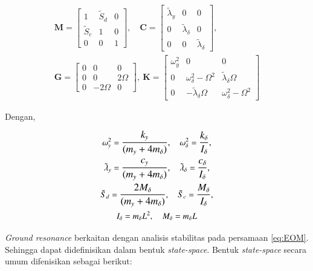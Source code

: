 \begin{equation}
\begin{gathered}
	\mathbf{M}=\begin{bmatrix}
		1& \tilde{S}_d& 0\\
		\tilde{S}_c& 1& 0\\
		0& 0& 1
	\end{bmatrix}, \quad
	\mathbf{C}=\begin{bmatrix}
		\tilde{\lambda}_y& 0& 0\\
		0& \tilde{\lambda}_{\delta}& 0\\
		0& 0& \tilde{\lambda}_{\delta} 
	\end{bmatrix}, \\
	\mathbf{G}=\begin{bmatrix}
		0& 0& 0\\
		0& 0& 2\Omega\\
		0& -2\Omega& 0
	\end{bmatrix}, \
	\mathbf{K}=\begin{bmatrix}
		\omega^2_y& 0& 0\\
		0& \omega^2_{\delta}-\Omega^2& \tilde{\lambda}_{\delta}\Omega\\
		0& -\tilde{\lambda}_{\delta}\Omega& \omega^2_{\delta}-\Omega^2
	\end{bmatrix}
\end{gathered}
\end{equation}

Dengan,

\begin{equation}
	\begin{gathered}
	\omega^2_y = \mathlarger{\frac{k_y}{(m_y+4m_{\delta})}},
	\quad 
	\omega^2_{\delta} = \mathlarger{\frac{k_{\delta}}{I_{\delta}}}, 
	\\
	\tilde{\lambda}_y = \mathlarger{\frac{c_y}{(m_y+4m_{\delta})}}, 
	\quad
	\tilde{\lambda}_{\delta} = \mathlarger{\frac{c_{\delta}}{I_{\delta}}}, 
	\\ 
	\tilde{S}_d = \mathlarger{\frac{2M_{\delta}}{(m_y+4m_{\delta})}}, 
	\quad 
	\tilde{S}_c = \mathlarger{\frac{M_{\delta}}{I_{\delta}}},
	\\
	I_{\delta} = m_{\delta}L^2, \quad M_{\delta}=m_{\delta}L
	\end{gathered}
\end{equation}

\textit{Ground resonance} berkaitan dengan analisis stabilitas pada persamaan \ref{eq:EOM}. Sehingga dapat didefinisikan dalam bentuk \textit{state-space}. Bentuk \textit{state-space} secara umum difenisikan sebagai berikut:

